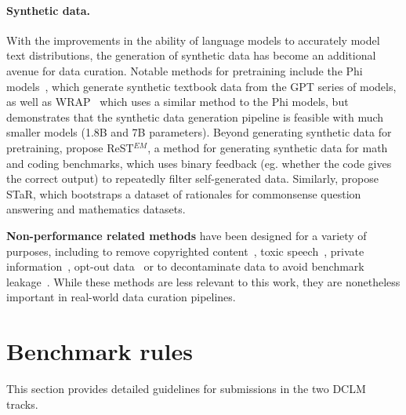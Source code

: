 \documentclass{article}
\newcommand{\dclm}{\textsc{DCLM}\xspace}
\begin{document}
\paragraph{Synthetic data.}
With the improvements in the ability of language models to accurately model text distributions, the generation of synthetic data has become an additional avenue for data curation. Notable methods for pretraining include the Phi models~\citep{gunasekar2023textbooks, abdin2024phi}, which generate synthetic textbook data from the GPT series of models, as well as WRAP~\citep{maini2024rephrasing} which uses a similar method to the Phi models, but demonstrates that the synthetic data generation pipeline is feasible with much smaller models (1.8B and 7B parameters).
Beyond generating synthetic data for pretraining, \citet{singh2024beyond} propose ReST$^{EM}$, a method for generating synthetic data for math and coding benchmarks, which uses binary feedback (eg. whether the code gives the correct output) to repeatedly filter self-generated data. Similarly, \citet{zelikman2022star} propose STaR, which bootstraps a dataset of rationales for commonsense question answering and mathematics datasets.

\textbf{Non-performance related methods} have been designed for a variety of purposes, including to remove copyrighted content~\citep{longpre2023data,shi2023detecting,shilov2024mosaic}, toxic speech~\citep{raffel2020exploring,ustun2024aya}, private information~\citep{allal2023santacoder,lozhkov2024starcoder}, opt-out data~\citep{lozhkov2024starcoder,muennighoff2023octopack} or to decontaminate data to avoid benchmark leakage~\citep{yang2023rethinking}. While these methods are less relevant to this work, they are nonetheless important in real-world data curation pipelines.


\section{Benchmark rules}\label{appx:benchmark-rules}
This section provides detailed guidelines for submissions  in the two \dclm tracks.
\end{document}
